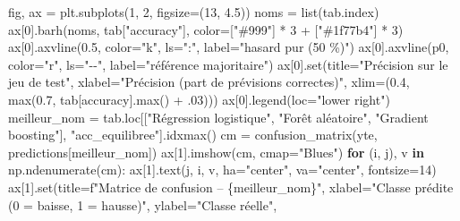 \documentclass[
  10pt,
]{article}
\newenvironment{Shaded}{}{}
\newcommand{\BuiltInTok}[1]{\textcolor[rgb]{0.00,0.50,0.00}{#1}}
\newcommand{\ControlFlowTok}[1]{\textcolor[rgb]{0.00,0.44,0.13}{\textbf{#1}}}
\newcommand{\DecValTok}[1]{\textcolor[rgb]{0.25,0.63,0.44}{#1}}
\newcommand{\FloatTok}[1]{\textcolor[rgb]{0.25,0.63,0.44}{#1}}
\newcommand{\KeywordTok}[1]{\textcolor[rgb]{0.00,0.44,0.13}{\textbf{#1}}}
\newcommand{\NormalTok}[1]{#1}
\newcommand{\OperatorTok}[1]{\textcolor[rgb]{0.40,0.40,0.40}{#1}}
\newcommand{\SpecialCharTok}[1]{\textcolor[rgb]{0.25,0.44,0.63}{#1}}
\newcommand{\SpecialStringTok}[1]{\textcolor[rgb]{0.73,0.40,0.53}{#1}}
\newcommand{\StringTok}[1]{\textcolor[rgb]{0.25,0.44,0.63}{#1}}
\begin{document}
\begin{Shaded}
\begin{Highlighting}[]
\NormalTok{fig, ax }\OperatorTok{=}\NormalTok{ plt.subplots(}\DecValTok{1}\NormalTok{, }\DecValTok{2}\NormalTok{, figsize}\OperatorTok{=}\NormalTok{(}\DecValTok{13}\NormalTok{, }\FloatTok{4.5}\NormalTok{))}
\NormalTok{noms }\OperatorTok{=} \BuiltInTok{list}\NormalTok{(tab.index)}
\NormalTok{ax[}\DecValTok{0}\NormalTok{].barh(noms, tab[}\StringTok{"accuracy"}\NormalTok{], color}\OperatorTok{=}\NormalTok{[}\StringTok{"\#999"}\NormalTok{] }\OperatorTok{*} \DecValTok{3} \OperatorTok{+}\NormalTok{ [}\StringTok{"\#1f77b4"}\NormalTok{] }\OperatorTok{*} \DecValTok{3}\NormalTok{)}
\NormalTok{ax[}\DecValTok{0}\NormalTok{].axvline(}\FloatTok{0.5}\NormalTok{, color}\OperatorTok{=}\StringTok{"k"}\NormalTok{, ls}\OperatorTok{=}\StringTok{":"}\NormalTok{, label}\OperatorTok{=}\StringTok{"hasard pur (50 \%)"}\NormalTok{)}
\NormalTok{ax[}\DecValTok{0}\NormalTok{].axvline(p0, color}\OperatorTok{=}\StringTok{"r"}\NormalTok{, ls}\OperatorTok{=}\StringTok{"{-}{-}"}\NormalTok{, label}\OperatorTok{=}\StringTok{"référence majoritaire"}\NormalTok{)}
\NormalTok{ax[}\DecValTok{0}\NormalTok{].}\BuiltInTok{set}\NormalTok{(title}\OperatorTok{=}\StringTok{"Précision sur le jeu de test"}\NormalTok{, xlabel}\OperatorTok{=}\StringTok{"Précision (part de prévisions correctes)"}\NormalTok{, xlim}\OperatorTok{=}\NormalTok{(}\FloatTok{0.4}\NormalTok{, }\BuiltInTok{max}\NormalTok{(}\FloatTok{0.7}\NormalTok{, tab[}\StringTok{\textquotesingle{}accuracy\textquotesingle{}}\NormalTok{].}\BuiltInTok{max}\NormalTok{() }\OperatorTok{+} \FloatTok{.03}\NormalTok{)))}
\NormalTok{ax[}\DecValTok{0}\NormalTok{].legend(loc}\OperatorTok{=}\StringTok{"lower right"}\NormalTok{)}
\NormalTok{meilleur\_nom }\OperatorTok{=}\NormalTok{ tab.loc[[}\StringTok{"Régression logistique"}\NormalTok{, }\StringTok{"Forêt aléatoire"}\NormalTok{, }\StringTok{"Gradient boosting"}\NormalTok{], }\StringTok{"acc\_equilibree"}\NormalTok{].idxmax()}
\NormalTok{cm }\OperatorTok{=}\NormalTok{ confusion\_matrix(yte, predictions[meilleur\_nom])}
\NormalTok{ax[}\DecValTok{1}\NormalTok{].imshow(cm, cmap}\OperatorTok{=}\StringTok{"Blues"}\NormalTok{)}
\ControlFlowTok{for}\NormalTok{ (i, j), v }\KeywordTok{in}\NormalTok{ np.ndenumerate(cm): ax[}\DecValTok{1}\NormalTok{].text(j, i, v, ha}\OperatorTok{=}\StringTok{"center"}\NormalTok{, va}\OperatorTok{=}\StringTok{"center"}\NormalTok{, fontsize}\OperatorTok{=}\DecValTok{14}\NormalTok{)}
\NormalTok{ax[}\DecValTok{1}\NormalTok{].}\BuiltInTok{set}\NormalTok{(title}\OperatorTok{=}\SpecialStringTok{f"Matrice de confusion – }\SpecialCharTok{\{}\NormalTok{meilleur\_nom}\SpecialCharTok{\}}\SpecialStringTok{"}\NormalTok{, xlabel}\OperatorTok{=}\StringTok{"Classe prédite (0 = baisse, 1 = hausse)"}\NormalTok{, ylabel}\OperatorTok{=}\StringTok{"Classe réelle"}\NormalTok{,}

\end{Highlighting}
\end{Shaded}
\end{document}
